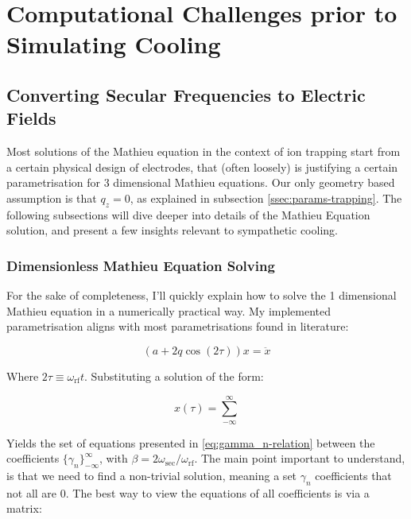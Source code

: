\chapter{Computational Challenges prior to Simulating Cooling}

\section{Converting Secular Frequencies to Electric Fields}\label{sec:comp/freqs2aq}

Most solutions of the Mathieu equation in the context of ion trapping start from a certain physical design of electrodes, that (often loosely\cite{AkermanThesis}) is justifying a certain parametrisation for 3 dimensional Mathieu equations. Our only geometry based assumption is that $q_z = 0$, as explained in subsection \ref{ssec:params-trapping}. The following subsections will dive deeper into details of the Mathieu Equation solution, and present a few insights relevant to sympathetic cooling. 

\subsection{Dimensionless Mathieu Equation Solving}

For the sake of completeness, I'll quickly explain how to solve the 1 dimensional Mathieu equation in a numerically practical way. My implemented parametrisation aligns with most parametrisations found in literature:

\begin{equation}
	(a + 2 q \cos(2 \tau)) x = \ddot{x}
	\label{eq:bare-mathieu}
\end{equation}

Where $2\tau \equiv \omega_\mathrm{rf} t$. Substituting a solution of the form:

$$x(\tau) = \sum_{-\infty}^\infty $$

Yields the set of equations presented in \ref{eq:gamma_n-relation} between the coefficients $\{\gamma_n\}_{-\infty}^\infty$, with $\beta = 2 \omega_\mathrm{sec}/\omega_\mathrm{rf}$. The main point important to understand, is that we need to find a non-trivial solution, meaning a set $\gamma_n$ coefficients that not all are $0$. The best way to view the equations of all coefficients is via a matrix:

